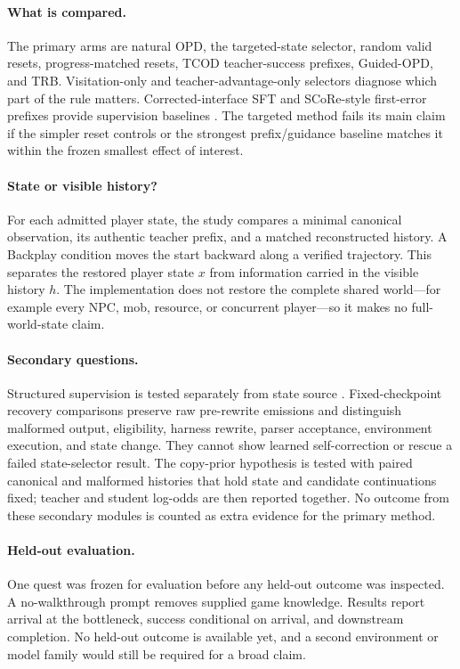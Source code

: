 \documentclass[11pt,a4paper]{article}
\begin{document}
\paragraph{What is compared.}
The primary arms are natural OPD, the targeted-state selector, random valid
resets, progress-matched resets, TCOD teacher-success prefixes, Guided-OPD, and
TRB. Visitation-only and teacher-advantage-only selectors diagnose which part of
the rule matters. Corrected-interface SFT and SCoRe-style first-error prefixes
provide supervision baselines \citep{lyu2025score}. The targeted method fails
its main claim if the simpler reset controls or the strongest prefix/guidance
baseline matches it within the frozen smallest effect of interest.

\paragraph{State or visible history?}
For each admitted player state, the study compares a minimal canonical
observation, its authentic teacher prefix, and a matched reconstructed history.
A Backplay condition moves the start backward along a verified trajectory.
This separates the restored player state $x$ from information carried in the
visible history $h$. The implementation does not restore the complete shared
world---for example every NPC, mob, resource, or concurrent player---so it
makes no full-world-state claim.

\paragraph{Secondary questions.}
Structured supervision is tested separately from state source
\citep{liu2026sad}. Fixed-checkpoint recovery comparisons preserve raw
pre-rewrite emissions and distinguish malformed output, eligibility, harness
rewrite, parser acceptance, environment execution, and state change. They
cannot show learned self-correction or rescue a failed state-selector result.
The copy-prior hypothesis is tested with paired canonical and malformed
histories that hold state and candidate continuations fixed; teacher and student
log-odds are then reported together. No outcome from these secondary modules is
counted as extra evidence for the primary method.

\paragraph{Held-out evaluation.}
One quest was frozen for evaluation before any held-out outcome was inspected.
A no-walkthrough prompt removes supplied game knowledge. Results report
arrival at the bottleneck, success conditional on arrival, and downstream
completion. No held-out outcome is available yet, and a second environment or
model family would still be required for a broad claim.
\end{document}
